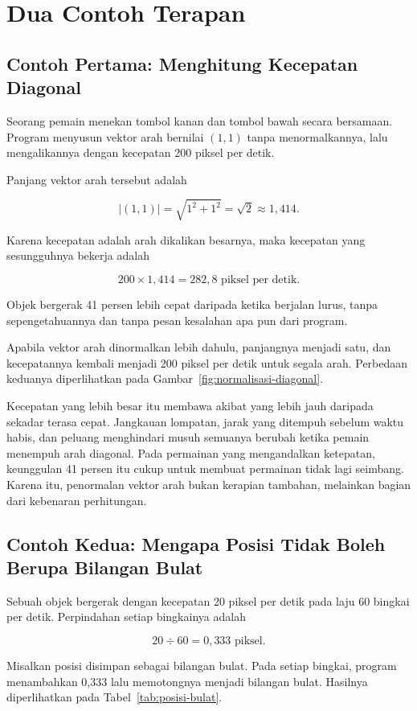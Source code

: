 \section{Dua Contoh Terapan}
\label{sec:contoh-bab-5}

\subsection{Contoh Pertama: Menghitung Kecepatan Diagonal}

\begin{contohbox}
Seorang pemain menekan tombol kanan dan tombol bawah secara bersamaan.
Program menyusun vektor arah bernilai $(1, 1)$ tanpa menormalkannya, lalu
mengalikannya dengan kecepatan 200 piksel per detik.

Panjang vektor arah tersebut adalah

\[
|(1, 1)| = \sqrt{1^2 + 1^2} = \sqrt{2} \approx 1{,}414 .
\]

Karena kecepatan adalah arah dikalikan besarnya, maka kecepatan yang
sesungguhnya bekerja adalah

\[
200 \times 1{,}414 = 282{,}8 \text{ piksel per detik}.
\]

Objek bergerak 41 persen lebih cepat daripada ketika berjalan lurus, tanpa
sepengetahuannya dan tanpa pesan kesalahan apa pun dari program.
\end{contohbox}

Apabila vektor arah dinormalkan lebih dahulu, panjangnya menjadi satu, dan
kecepatannya kembali menjadi 200 piksel per detik untuk segala arah. Perbedaan
keduanya diperlihatkan pada Gambar~\ref{fig:normalisasi-diagonal}.

Kecepatan yang lebih besar itu membawa akibat yang lebih jauh
daripada sekadar terasa cepat. Jangkauan lompatan, jarak yang ditempuh sebelum
waktu habis, dan peluang menghindari musuh semuanya berubah ketika pemain
menempuh arah diagonal. Pada permainan yang mengandalkan ketepatan, keunggulan
41 persen itu cukup untuk membuat permainan tidak lagi seimbang. Karena itu,
penormalan vektor arah bukan kerapian tambahan, melainkan bagian dari
kebenaran perhitungan.

\subsection{Contoh Kedua: Mengapa Posisi Tidak Boleh Berupa Bilangan Bulat}

\begin{contohbox}
Sebuah objek bergerak dengan kecepatan 20 piksel per detik pada laju 60
bingkai per detik. Perpindahan setiap bingkainya adalah

\[
20 \div 60 = 0{,}333 \text{ piksel}.
\]

Misalkan posisi disimpan sebagai bilangan bulat. Pada setiap bingkai, program
menambahkan 0,333 lalu memotongnya menjadi bilangan bulat. Hasilnya
diperlihatkan pada Tabel~\ref{tab:posisi-bulat}.
\end{contohbox}

